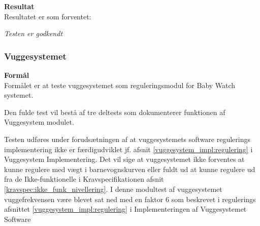 
\textbf{Resultat} \\
Resultatet er som forventet:

\textit{Testen er godkendt}

\subsubsection{Vuggesystemet}
\textbf{Formål} \\
Formålet er at teste vuggesystemet som reguleringsmodul for Baby Watch systemet. 

Den fulde test vil bestå af tre deltests som dokumenterer funktionen af Vuggesystem modulet.

Testen udføres under forudsætningen af at vuggesystemets software regulerings implementering ikke er færdigudviklet jf. afsnit \vref{vuggesystem_impl:regulering} i Vuggesystem Implementering. Det vil sige at vuggesystemet ikke forventes at kunne regulere med vægt i barnevognskurven eller fuldt ud at kunne regulere ud fra de Ikke-funktionelle i Kravspecifikationen afsnit \vref{kravspec:ikke_funk_nivellering}. I denne modultest af vuggesystemet vuggefrekvensen være blevet sat ned med en faktor 6 som beskrevet i regulerings afsnittet \vref{vuggesystem_impl:regulering} i Implementeringen af Vuggesystemet Software

